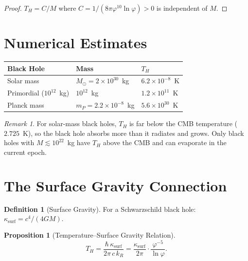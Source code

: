 \documentclass[12pt,a4paper]{article}
\newtheorem{proposition}[theorem]{Proposition}
\theoremstyle{definition}
\newtheorem{definition}[theorem]{Definition}
\theoremstyle{remark}
\newtheorem{remark}[theorem]{Remark}
\begin{document}
\begin{proof}
$T_H = C/M$ where $C = 1/(8\pi\varphi^{10}\ln\varphi) > 0$ is
independent of $M$.
\end{proof}

\section{Numerical Estimates}
\label{sec:numerical}

\begin{center}
\renewcommand{\arraystretch}{1.3}
\begin{tabular}{@{}lll@{}}
\toprule
\textbf{Black Hole} & \textbf{Mass} & \textbf{$T_H$} \\
\midrule
Solar mass & $M_\odot = 2 \times 10^{30}$~kg &
$6.2 \times 10^{-8}$~K \\
Primordial ($10^{12}$~kg) & $10^{12}$~kg &
$1.2 \times 10^{11}$~K \\
Planck mass & $m_P = 2.2 \times 10^{-8}$~kg &
$5.6 \times 10^{30}$~K \\
\bottomrule
\end{tabular}
\end{center}

\begin{remark}
For solar-mass black holes, $T_H$ is far below the CMB temperature
($2.725$~K), so the black hole absorbs more than it radiates and
grows.  Only black holes with $M \lesssim 10^{22}$~kg have $T_H$
above the CMB and can evaporate in the current epoch.
\end{remark}

\section{The Surface Gravity Connection}
\label{sec:surface-gravity}

\begin{definition}[Surface Gravity]
For a Schwarzschild black hole:
$\kappa_{\mathrm{surf}} = c^4/(4GM)$.
\end{definition}

\begin{proposition}[Temperature--Surface Gravity Relation]
\begin{equation}
  T_H = \frac{\hbar\,\kappa_{\mathrm{surf}}}{2\pi\,c\,k_R}
  = \frac{\kappa_{\mathrm{surf}}}{2\pi} \cdot
  \frac{\varphi^{-5}}{\ln\varphi}.
\end{equation}
\end{proposition}
\end{document}

